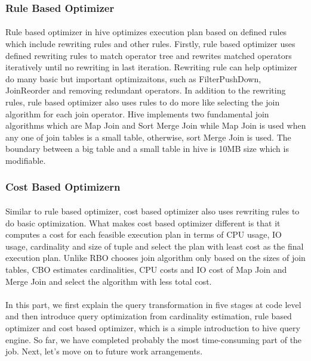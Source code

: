         \subsubsection{Rule Based Optimizer}
            \paragraph{}
            Rule based optimizer in hive optimizes execution plan based on defined rules which include rewriting rules and other rules. 
            Firstly, rule based optimizer uses defined rewriting rules to match operator tree and rewrites matched operators iteratively 
            until no rewriting in last iteration. Rewriting rule can help optimizer do many basic but important optimizaitons, such
            as FilterPushDown, JoinReorder and removing redundant operators. In addition to the rewriting rules, rule based optimizer
            also uses rules to do more like selecting the join algorithm for each join operator. Hive implements two fundamental join algorithms 
            which are Map Join and Sort Merge Join while Map Join is used when any one of join tables is a small table, otherwise, sort 
            Merge Join is used. The boundary between a big table and a small table in hive is 10MB size which is modifiable.   
        \subsubsection{Cost Based Optimizern} 
            \paragraph{}
            Similar to rule based optimizer, cost based optimizer also uses rewriting rules to do basic optimization. What makes 
            cost based optimizer different is that it computes a cost for each feasible execution plan in terms of CPU usage, IO usage, 
            cardinality and size of tuple and select the plan with least cost as the final execution plan. Unlike RBO chooses join algorithm
            only based on the sizes of join tables, CBO estimates cardinalities, CPU costs and IO cost of Map Join and Merge Join and select the
            algorithm with less total cost. 
    \paragraph{}
    In this part, we first explain the query transformation in five stages at code level and then introduce query optimization from cardinality 
    estimation, rule based optimizer and cost based optimizer, which is a simple introduction to hive query engine. So far, we have completed 
    probably the most time-consuming part of the job. Next, let's move on to future work arrangements.

